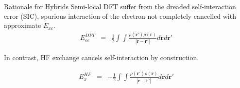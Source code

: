 \documentclass[aspectratio=169]{beamer}
\let \vec \mathbf
\begin{document}
    \begin{frame}{Rationale for Hybrids}
        Semi-local DFT suffer from the dreaded self-interaction error (SIC), spurious interaction of the electron not completely cancelled with approximate $E_{xc}$.
        \begin{eqnarray*}
            E^{DFT}_{ee} & = & \frac{1}{2} \int \int \frac{\rho(\vec{r'})\rho(\vec{r})}{|\vec{r}-\vec{r'}|} d\vec{r}d\vec{r'}
        \end{eqnarray*}

        In contrast, HF exchange cancels self-interaction by construction.

        \begin{eqnarray*}
            E^{HF}_{x} & = & - \frac{1}{2} \int \int \frac{\rho(\vec{r'})\rho(\vec{r})}{|\vec{r}-\vec{r'}|} d\vec{r}d\vec{r'}
        \end{eqnarray*}
    \end{frame}
\end{document}
